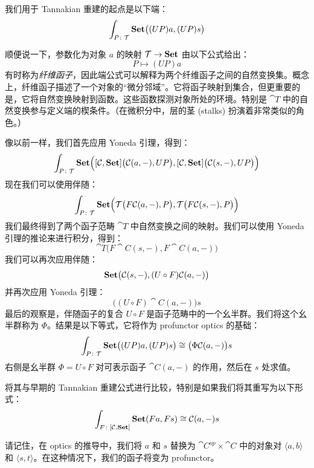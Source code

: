 \documentclass[DaoFP]{subfiles}
\begin{document}
 我们用于 Tannakian 重建的起点是以下端：
 \[ \int_{P \colon \mathcal{T}} \mathbf{Set} \big((U P) a, (U P) s\big) \]

 顺便说一下，参数化为对象 $a$ 的映射 $\mathcal{T} \to \mathbf{Set}$ 由以下公式给出：
 \[ P \mapsto (U P) a \]
 有时称为\emph{纤维函子}，因此端公式可以解释为两个纤维函子之间的自然变换集。概念上，纤维函子描述了一个对象的“微分邻域”。它将函子映射到集合，但更重要的是，它将自然变换映射到函数。这些函数探测对象所处的环境。特别是 $\cat T$ 中的自然变换参与定义端的楔条件。（在微积分中，层的茎 (stalks) 扮演着非常类似的角色。）

 像以前一样，我们首先应用 Yoneda 引理，得到：
 \[ \int_{P \colon \mathcal{T}} \mathbf{Set} \Big([\mathcal{C}, \mathbf{Set}] \big( \mathcal{C} (a ,-), U P\big), [\mathcal{C}, \mathbf{Set}] \big( \mathcal{C} (s ,-), U P\big)\Big) \]
 现在我们可以使用伴随：
 \[ \int_{P \colon \mathcal{T}} \mathbf{Set} \Big(\mathcal{T} \big( F \mathcal{C} (a ,-), P\big), \mathcal{T} \big( F \mathcal{C} (s ,-), P\big)\Big) \]
 我们最终得到了两个函子范畴 $\cat T$ 中自然变换之间的映射。我们可以使用 Yoneda 引理的推论来进行积分，得到：
 \[ \cat T\big( F \cat C (s ,-), F \cat C (a ,-) \big) \]
 我们可以再次应用伴随：
 \[ \mathbf{Set} \big( \mathcal{C} (s ,-), (U\circ F) \mathcal{C} (a ,-) \big) \]
 并再次应用 Yoneda 引理：
 \[ \big( (U\circ F) \cat C (a ,-) \big) s \]
 最后的观察是，伴随函子的复合 $U \circ F$ 是函子范畴中的一个幺半群。我们将这个幺半群称为 $\Phi$。结果是以下等式，它将作为 profunctor optics 的基础：
 \[ \int_{P \colon \mathcal{T}} \mathbf{Set} \big((U P) a, (U P) s\big) \cong \big( \Phi \mathcal{C} (a ,-) \big) s \]
 右侧是幺半群 $\Phi = U \circ F$ 对可表示函子 $\cat C (a, -)$ 的作用，然后在 $s$ 处求值。

 将其与早期的 Tannakian 重建公式进行比较，特别是如果我们将其重写为以下形式：
 \[ \int_{F \colon [\mathcal{C}, \mathbf{Set}]} \mathbf{Set} (F a, F s) \cong \mathcal{C}(a, -) s\]

 请记住，在 optics 的推导中，我们将 $a$ 和 $s$ 替换为 $\cat C^{op} \times \cat C$ 中的对象对 $\langle a, b \rangle$ 和 $\langle s, t \rangle$。在这种情况下，我们的函子将变为 profunctor。
\end{document}
